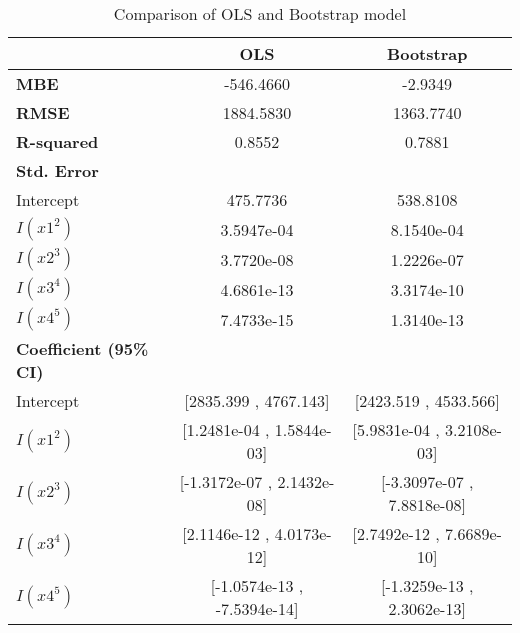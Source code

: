 \begin{table}[]
	\centering
	\caption{Comparison of OLS and Bootstrap model}
	\begin{tabular}{lcc}
		\hline
		& \textbf{OLS} & \textbf{Bootstrap} \\
		\hline
		\textbf{MBE} & -546.4660 & -2.9349 \\
		\textbf{RMSE} & 1884.5830 & 1363.7740 \\
		\textbf{R-squared} & 0.8552 & 0.7881 \\
		\hline
		\textbf{Std. Error} \\
		\hline
		Intercept & 475.7736 & 538.8108 \\
		$I(x1^2)$ & 3.5947e-04 & 8.1540e-04 \\
		$I(x2^3)$ & 3.7720e-08 & 1.2226e-07 \\
		$I(x3^4)$ & 4.6861e-13 & 3.3174e-10 \\
		$I(x4^5)$ & 7.4733e-15 & 1.3140e-13 \\
		\hline
		\textbf{Coefficient (95\% CI)} \\
		\hline
		Intercept & [2835.399 , 4767.143] & [2423.519 , 4533.566] \\
		$I(x1^2)$ & [1.2481e-04 , 1.5844e-03] & [5.9831e-04 , 3.2108e-03] \\
		$I(x2^3)$ & [-1.3172e-07 , 2.1432e-08] & [-3.3097e-07 , 7.8818e-08] \\
		$I(x3^4)$ & [2.1146e-12 , 4.0173e-12] & [2.7492e-12 , 7.6689e-10] \\
		$I(x4^5)$ & [-1.0574e-13 , -7.5394e-14] & [-1.3259e-13 , 2.3062e-13] \\
		\hline
	\end{tabular}
\end{table}


